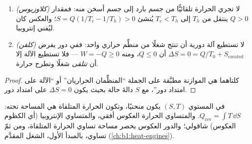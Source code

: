 \begin{proposition}[نتيجتان]\label{prop:b1:second-law-entropy:clausiuskelvin}
\begin{enumerate}
  \item \emph{(كلاوزيوس)} لا تجري الحرارة تلقائيًّا من جسم بارد
        إلى جسم أسخن منه: فمقدار $Q > 0$ ينتقل من $T_h$ إلى
        $T_c < T_h$ يُنشئ $S = Q(1/T_c - 1/T_h) > 0$؛ والعكس كان
        ليُفني إنتروبيا.
  \item \emph{(كلفن)} لا تستطيع آلة دورية أن تنتج شغلًا من منظِّم
        حراري واحد: ففي دور يفرض $\Delta S = 0 = Q/T_0 + S_{\mathrm{created}}$
        أن $Q \leq 0$، ومنه $W = -Q \geq 0$ --- فلا تستطيع الآلة إلا أن
        \emph{تتلقى} شغلًا وتطرح حرارة.
\end{enumerate}
\end{proposition}

\begin{proof}
كلتاهما هي الموازنة مطبَّقة على الجملة ``المنظِّمان الحراريان'' أو
``الآلة على امتداد دور''، مع $S$ دالةَ حالة بحيث يكون $\Delta S
= 0$ على امتداد دور.
\end{proof}

\begin{definition}\label{def:b1:second-law-entropy:TS}
في المستوي $(S, T)$ يكون  منحنيًا، وتكون
الحرارة المتلقاة هي المساحة تحته: $Q_{\mathrm{rev}} = \int T\,\dd S$.
والمتساوي الحرارة العكوس أفقي، والمتساوي الإنتروبيا (أي الكظوم العكوس)
شاقولي؛ والدور العكوس يحصر مساحة تساوي الحرارة المتلقاة،
ومن ثمّ تساوي، بالمبدأ الأول، الشغل المقدَّم
(\cref{ch:b1:heat-engines}).
\end{definition}

